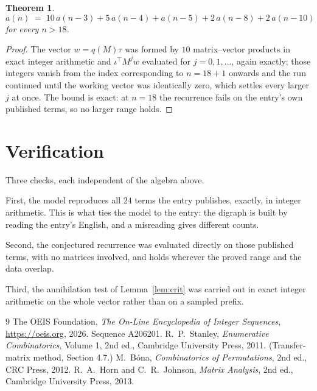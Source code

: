 \documentclass[11pt,a4paper]{article}
\theoremstyle{plain}
\newtheorem{theorem}{Theorem}
\theoremstyle{definition}
\begin{document}
\begin{theorem}
\[
a(n)\;=\;10\,a(n-3) + 5\,a(n-4) + a(n-5) + 2\,a(n-8) + 2\,a(n-10)
\]
for every $n>18$.
\end{theorem}

\begin{proof}
The vector $w=q(M)\tau$ was formed by $10$ matrix--vector products in exact integer
arithmetic and $\iota^{\!\top}M^{j}w$ evaluated for $j=0,1,\dots$, again exactly; those
integers vanish from the index corresponding to $n=18+1$ onwards and the run continued
until the working vector was identically zero, which settles every larger $j$ at once. The bound is exact: at $n=18$ the recurrence fails on the entry's own published terms, so no larger range holds.
\end{proof}

\section{Verification}

Three checks, each independent of the algebra above.

First, the model reproduces all $24$ terms the entry publishes, exactly, in integer
arithmetic. This is what ties the model to the entry: the digraph is built by reading the
entry's English, and a misreading gives different counts.

Second, the conjectured recurrence was evaluated directly on those published terms, with no
matrices involved, and holds wherever the proved range and the data overlap.

Third, the annihilation test of Lemma~\ref{lem:crit} was carried out in exact integer
arithmetic on the whole vector rather than on a sampled prefix.

\begin{thebibliography}{9}
 The OEIS Foundation, \emph{The On-Line Encyclopedia of Integer
Sequences}, \url{https://oeis.org}, 2026. Sequence A206201.
 R.~P.~Stanley, \emph{Enumerative Combinatorics}, Volume 1, 2nd ed.,
Cambridge University Press, 2011. (Transfer-matrix method, Section 4.7.)
 M.~B\'ona, \emph{Combinatorics of Permutations}, 2nd ed., CRC
Press, 2012.
 R.~A.~Horn and C.~R.~Johnson, \emph{Matrix Analysis}, 2nd ed., Cambridge
University Press, 2013.
\end{thebibliography}
\end{document}
